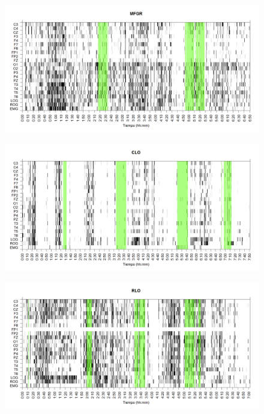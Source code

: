 \documentclass[12pt,a4paper]{mitthesis}
\begin{document}

\begin{figure}
\centering
\includegraphics[width=0.9\linewidth]
{./g170413/GURM251148SUE_est.png} 
\label{grf_MFGR}
\end{figure}


\begin{figure}
\centering
\includegraphics[width=0.9\linewidth]
{./g170413/CLMN10SUE_est.png} 
\label{grf_CLO}
\end{figure}


\begin{figure}
\centering
\includegraphics[width=0.9\linewidth]
{./g170413/RLMN10SUE_est.png} 
\label{grf_RLO}
\end{figure}
\end{document}
